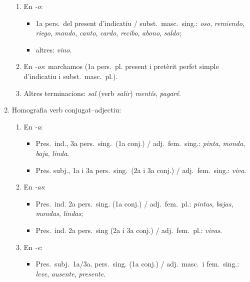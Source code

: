 \begin{enumerate}
\begin{enumerate}
   \item En \emph{-o}: 
   \begin{itemize}
     \item 1a pers.\ del
      present d'indicatiu / subst.\ masc.\ sing.: \emph{oso}, \emph{remiendo}, \emph{riego}, \emph{mando}, 
      \emph{canto}, \emph{cardo}, \emph{recibo}, \emph{abono}, \emph{saldo};
     \item altres: \emph{vino}.
   \end{itemize}  

   \item En \emph{-os}:
       marchamos (1a pers.\ pl. present i pretèrit perfet simple
       d'indicatiu i subst.\ masc.\ pl.).

   \item Altres terminacions: \emph{sal} (verb \emph{salir})
       \emph{mentís}, \emph{pagaré}.
  
   
\end{enumerate}
\item Homografia verb conjugat--adjectiu:
 \begin{enumerate}

   \item En \emph{-a}: 
   \begin{itemize}
   \item Pres.\ ind., 3a pers.\  sing.\ (1a conj.) / adj.\ fem.\ sing.: {\em
       pinta}, \emph{monda},
   \emph{ baja}, \emph{linda}.
   \item Pres. subj., 1a i 3a pers.\ sing.\ (2a i 3a conj.) / adj.\ fem.\ sing.:
       \emph{viva}.
   \end{itemize} 

   \item En \emph{-as}:
   \begin{itemize}
   \item Pres.\ ind. 2a pers.\ sing. (1a conj.) / adj.\ fem.\ pl.:
       \emph{pintas}, \emph{bajas}, \emph{mondas}, \emph{lindas};
   \item Pres.\ ind. 2a pers.\ sing (2a i 3a  conj.) / adj.\ fem.\ pl.:
       \emph{vivas}.
   \end{itemize}

   \item En \emph{-e}: 
   \begin{itemize}
   \item Pres.\ subj.\ 1a/3a. pers.\ sing. (1a conj.) / adj.\ masc.\ i fem.\
     sing.: \emph{leve},  \emph{ausente}, \emph{presente}.
   \end{itemize}


\end{enumerate}
\end{enumerate}
